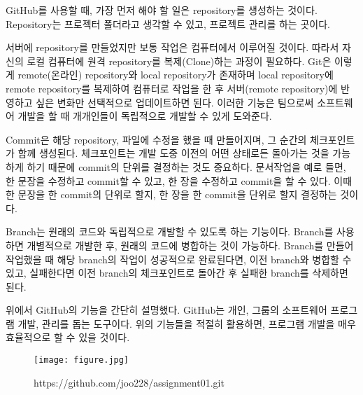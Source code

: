 \documentclass[prodmode,acmtap]{ci2014}
\begin{document}
GitHub를 사용할 때, 가장 먼저 해야 할 일은 repository를 생성하는 것이다. Repository는 프로젝터 폴더라고 생각할 수 있고, 프로젝트 관리를 하는 곳이다.

서버에 repository를 만들었지만 보통 작업은 컴퓨터에서 이루어질 것이다. 따라서 자신의 로컬 컴퓨터에 원격 repository를 복제(Clone)하는 과정이 필요하다. Git은 이렇게 remote(온라인) repository와 local repository가 존재하며 local repository에 remote repository를 복제하여 컴퓨터로 작업을 한 후 서버(remote repository)에 반영하고 싶은 변화만 선택적으로 업데이트하면 된다. 이러한 기능은 팀으로써 소프트웨어 개발을 할 때 개개인들이 독립적으로 개발할 수 있게 도와준다.

Commit은 해당 repository, 파일에 수정을 했을 때 만들어지며, 그 순간의 체크포인트가 함께 생성된다. 체크포인트는 개발 도중 이전의 어떤 상태로든 돌아가는 것을 가능하게 하기 때문에 commit의 단위를 결정하는 것도 중요하다. 문서작업을 예로 들면, 한 문장을 수정하고 commit할 수 있고, 한 장을 수정하고 commit을 할 수 있다. 이때 한 문장을 한 commit의 단위로 할지, 한 장을 한 commit을 단위로 할지 결정하는 것이다.

Branch는 원래의 코드와 독립적으로 개발할 수 있도록 하는 기능이다. Branch를 사용하면 개별적으로 개발한 후, 원래의 코드에 병합하는 것이 가능하다. Branch를 만들어 작업했을 때 해당 branch의 작업이 성공적으로 완료된다면, 이전 branch와 병합할 수 있고, 실패한다면 이전 branch의 체크포인트로 돌아간 후 실패한 branch를 삭제하면 된다.

위에서 GitHub의 기능을 간단히 설명했다. GitHub는 개인, 그룹의 소프트웨어 프로그램 개발, 관리를 돕는 도구이다. 위의 기능들을 적절히 활용하면, 프로그램 개발을 매우 효율적으로 할 수 있을 것이다.

\newpage

\begin{figure}[tp]
\centering
\texttt{[image: figure.jpg]}
\caption{https://github.com/joo228/assignment01.git}
\label{fig1}
\end{figure}
\end{document}
